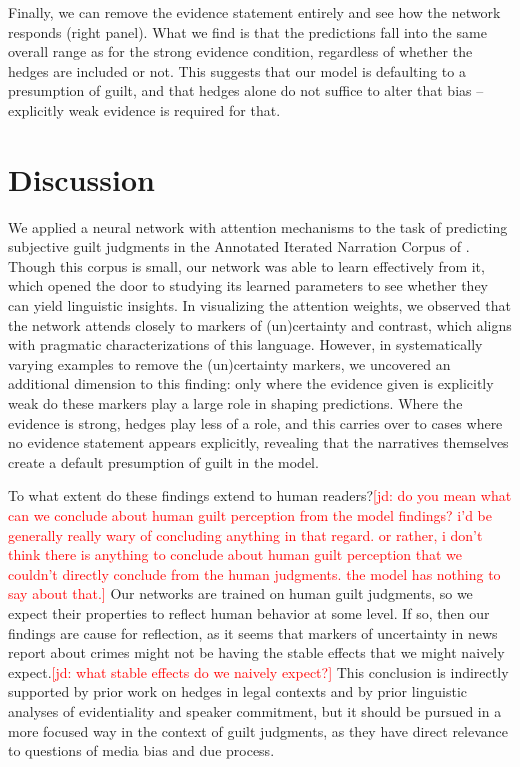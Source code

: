 \documentclass[11pt,a4paper]{article}
\newcommand{\jd}[1]{\textcolor{Red}{[jd: #1]}}
\begin{document}
Finally, we can remove the evidence statement entirely and see how the network responds (right panel). What we find is that the predictions fall into the same overall range as for the strong evidence condition, regardless of whether the hedges are included or not. This suggests that our model is defaulting to a presumption of guilt, and that hedges alone do not suffice to alter that bias -- explicitly weak evidence is required for that.


\section{Discussion}

We applied a neural network with attention mechanisms to the task of predicting subjective guilt judgments in the Annotated Iterated Narration Corpus of \citet{Kreiss:2019}. Though this corpus is small, our network was able to learn effectively from it, which opened the door to studying its learned parameters to see whether they can yield linguistic insights. In visualizing the attention weights, we observed that the network attends closely to markers of (un)certainty and contrast, which aligns with pragmatic characterizations of this language. However, in systematically varying examples to remove the (un)certainty markers, we uncovered an additional dimension to this finding: only where the evidence given is explicitly weak do these markers play a large role in shaping predictions. Where the evidence is strong, hedges play less of a role, and this carries over to cases where no evidence statement appears explicitly, revealing that the narratives themselves create a default presumption of guilt in the model.

To what extent do these findings extend to human readers?\jd{do you mean what can we conclude about human guilt perception from the model findings? i'd be generally really wary of concluding anything in that regard. or rather, i don't think there is anything to conclude about human guilt perception that we couldn't directly conclude from the human judgments. the model has nothing to say about that.} Our networks are trained on human guilt judgments, so we expect their properties to reflect human behavior at some level. If so, then our findings are cause for reflection, as it seems that markers of uncertainty in news report about crimes might not be having the stable effects that we might naively expect.\jd{what stable effects do we naively expect?} This conclusion is indirectly supported by prior work on hedges in legal contexts and by prior linguistic analyses of evidentiality and speaker commitment, but it should be pursued in a more focused way in the context of guilt judgments, as they have direct relevance to questions of media bias and due process.
\end{document}
